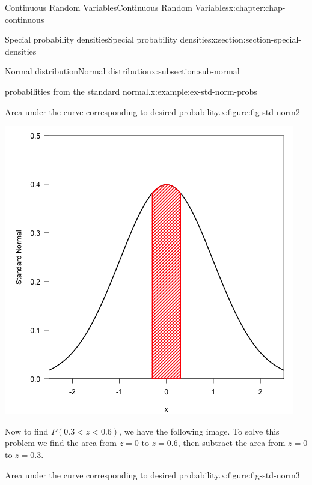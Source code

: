 \documentclass[oneside,10pt,]{book}
\newcommand{\lt}{<}
\begin{document}
\begin{chapterptx}{Continuous Random Variables}{}{Continuous Random Variables}{}{}{x:chapter:chap-continuous}
\begin{sectionptx}{Special probability densities}{}{Special probability densities}{}{}{x:section:section-special-densities}
\begin{subsectionptx}{Normal distribution}{}{Normal distribution}{}{}{x:subsection:sub-normal}
\begin{example}{probabilities from the standard normal.}{x:example:ex-std-norm-probs}
\begin{figureptx}{Area under the curve corresponding to desired probability.}{x:figure:fig-std-norm2}{}
\begin{image}{0.25}{0.5}{0.25}
\includegraphics[width=\linewidth]{./images/std_norm2.png}
\end{image}%
\tcblower
\end{figureptx}%
Now to find \(P(0.3 \lt z \lt 0.6)\), we have the following image. To solve this problem we find the area from \(z=0\) to \(z=0.6\), then subtract the area from \(z=0\) to \(z=0.3\).%
\begin{figureptx}{Area under the curve corresponding to desired probability.}{x:figure:fig-std-norm3}{}%
\begin{image}{0.25}{0.5}{0.25}%

\end{image}
\end{figureptx}
\end{example}
\end{subsectionptx}
\end{sectionptx}
\end{chapterptx}
\end{document}

